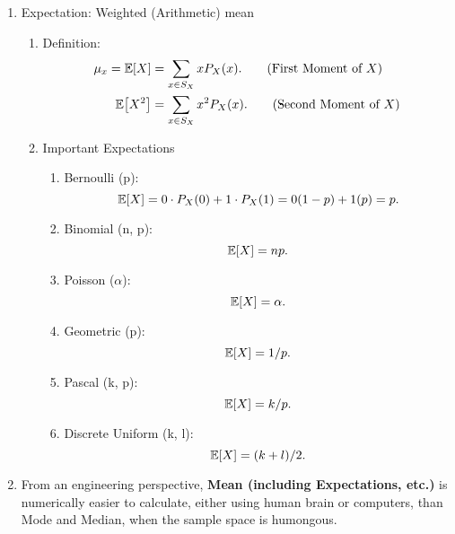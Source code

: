 \begin{enumerate}
{\begin{enumerate}
{\begin{enumerate}
                \item Mode: The outcome appears the most often in the sample space \[P_X(x_{\textnormal{mode}})\geq P_X(x).\]
                \item Median: The outcome which separates the higher half from  the lower half of a sample space \[P_X[X \leq x_{\textnormal{med}}] \geq 1/2, \qquad \qquad P_X[X \geq x_{\textnormal{med}}] \geq 1/2.\]
                \item (Arithmetic) mean:  The sum of all the outcomes divided by the number of outcomes \[\bar{x} = \frac{1}{n}\sum_{i=1}^{n}x_i.\]
            \end{enumerate}
            }
            \item Expectation: Weighted (Arithmetic) mean{
                \begin{enumerate}
                    \item Definition:{
                        \begin{align}
                            \mu_x = \E{X}&=\sum_{x\in S_X}xP_X(x). \tag{First Moment of $X$}\\
                            \E{X^2}&=\sum_{x\in S_X}x^2P_X(x). \tag{Second Moment of $X$}
                        \end{align}
                    }
                    \item Important Expectations{
                        \begin{enumerate}
                            \item Bernoulli (p): \[\E{X}=0\cdot P_X(0)+1\cdot P_X(1)=0(1-p)+1(p)=p.\]
                            \item Binomial (n, p): \[\E{X}=np.\]
                            \item Poisson ($\alpha$): \[\E{X}=\alpha.\]
                            \item Geometric (p): \[\E{X}=1/p.\]
                            \item Pascal (k, p): \[\E{X}=k/p.\]
                            \item Discrete Uniform (k, l): \[\E{X}=(k+l)/2.\]
                        \end{enumerate}
                    }
                \end{enumerate}
            }
            \item From an engineering perspective, \textbf{Mean (including Expectations, etc.)} is numerically easier to calculate, either using human brain or computers, than Mode and Median, when the sample space is humongous.

\end{enumerate}}
\end{enumerate}
